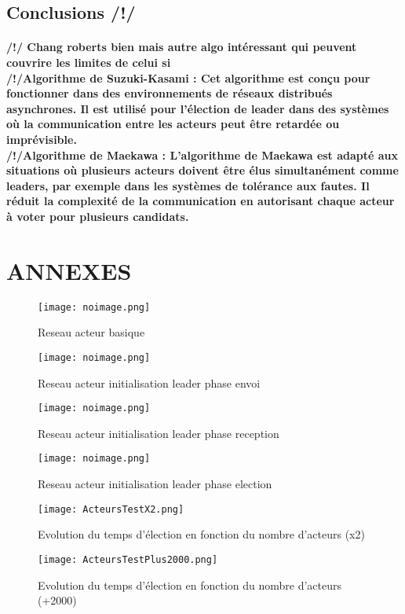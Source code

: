 \documentclass[12pt]{article}
\begin{document}
\subsection{Conclusions /!/}
\paragraph{/!/ Chang roberts bien mais autre algo intéressant qui peuvent couvrire les limites de celui si \\
/!/Algorithme de Suzuki-Kasami : Cet algorithme est conçu pour fonctionner dans des environnements de réseaux distribués asynchrones. Il est utilisé pour l'élection de leader dans des systèmes où la communication entre les acteurs peut être retardée ou imprévisible.\\
/!/Algorithme de Maekawa : L'algorithme de Maekawa est adapté aux situations où plusieurs acteurs doivent être élus simultanément comme leaders, par exemple dans les systèmes de tolérance aux fautes. Il réduit la complexité de la communication en autorisant chaque acteur à voter pour plusieurs candidats.\\}


\newpage
\section{ANNEXES}
\begin{figure}[ht]
    \centering
    \texttt{[image: noimage.png]}
    \caption{Reseau acteur basique}
    \label{fig:AnneauBasique}
\end{figure}

\begin{figure}[ht]
    \centering
    \texttt{[image: noimage.png]}
    \caption{Reseau acteur initialisation leader phase envoi}
    \label{fig:AnneauPhaseEnvoi}
\end{figure}

\begin{figure}[ht]
    \centering
    \texttt{[image: noimage.png]}
    \caption{Reseau acteur initialisation leader phase reception}
    \label{fig:AnneauPhaseReception}
\end{figure}

\begin{figure}[ht]
    \centering
    \texttt{[image: noimage.png]}
    \caption{Reseau acteur initialisation leader phase election}
    \label{fig:AnneauPhaseElection}
\end{figure}

\begin{figure}[ht]
    \centering
    \texttt{[image: ActeursTestX2.png]}
    \caption{Evolution du temps d'élection en fonction du nombre d'acteurs (x2)}
    \label{fig:tempsElectionX2}
\end{figure}

\begin{figure}[ht]
    \centering
    \texttt{[image: ActeursTestPlus2000.png]}
    \caption{Evolution du temps d'élection en fonction du nombre d'acteurs (+2000)}
    \label{fig:tempsElectionPlus2000}
\end{figure}
\end{document}
